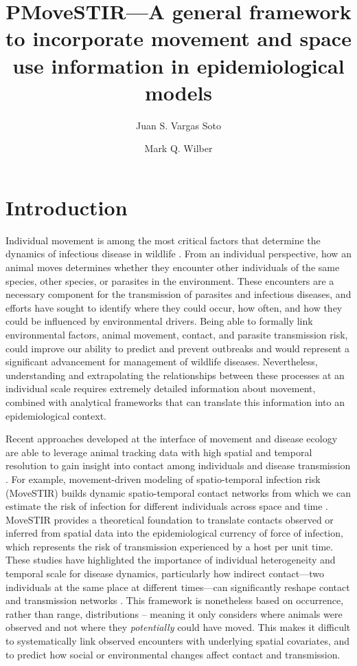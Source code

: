 \documentclass[letterpaper]{article}
\title{PMoveSTIR---A general framework to incorporate movement and space use information in epidemiological models}
\author{Juan S. Vargas Soto \and Mark Q. Wilber}
\affil{School of Natural Resources, University of Tennessee, Knoxville, TN}
\date{}
\begin{document}
\maketitle

\section*{Introduction}

Individual movement is among the most critical factors that determine the dynamics of infectious disease in wildlife \citep{Manlove2022,Dougherty2022}. 
From an individual perspective, how an animal moves determines whether they encounter other individuals of the same species, other species, or parasites in the environment. 
These encounters are a necessary component for the transmission of parasites and infectious diseases, and efforts have sought to identify where they could occur, how often, and how they could be influenced by environmental drivers. 
Being able to formally link environmental factors, animal movement, contact, and parasite transmission risk, could improve our ability to predict and prevent outbreaks and would represent a significant advancement for management of wildlife diseases.  
Nevertheless, understanding and extrapolating the relationships between these processes at an individual scale requires extremely detailed information about movement, combined with analytical frameworks that can translate this information into an epidemiological context.

Recent approaches developed at the interface of movement and disease ecology are able to leverage animal tracking data with high spatial and temporal resolution to gain insight into contact among individuals and disease transmission \citep{Wilber2022,Yang2023}. For example, movement-driven modeling of spatio-temporal infection risk (MoveSTIR) builds dynamic spatio-temporal contact networks from which we can estimate the risk of infection for different individuals across space and time \citep{Wilber2022}. MoveSTIR provides a theoretical foundation to translate contacts observed or inferred from spatial data into the epidemiological currency of force of infection, which represents the risk of transmission experienced by a host per unit time. These studies have highlighted the importance of individual heterogeneity and temporal scale for disease dynamics, particularly how indirect contact---two individuals at the same place at different times---can significantly reshape contact and transmission networks \citep{Wilber2022,Yang2023}. This framework is nonetheless based on occurrence, rather than range, distributions \citep[in the terminology of ][]{Alston2022} -- meaning it only considers where animals were observed and not where they \emph{potentially} could have moved. This makes it difficult to systematically link observed encounters with underlying spatial covariates, and to predict how social or environmental changes affect contact and transmission. 
\end{document}
